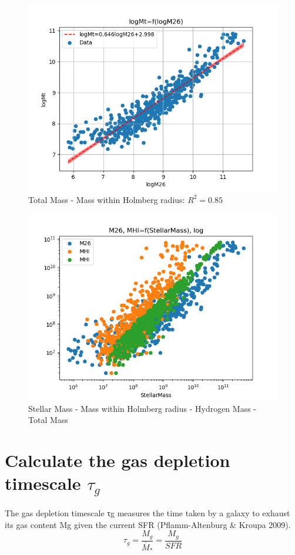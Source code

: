 \documentclass[a4paper]{article}
\begin{document}
\begin{figure}[htbp]
\centering
\includegraphics[width=.9\linewidth]{./graphs/logM26-logMt.png}
\caption{\label{Total Mass - Mass within Holmberg radius}Total Mass - Mass within Holmberg radius: \(R^2=0.85\)}
\end{figure}


\begin{figure}[htbp]
\centering
\includegraphics[width=.9\linewidth]{./graphs/M-MHI-M26.png}
\caption{\label{Stellar Mass - Mass within Holmberg radius - Hydrogen Mass - Total Mass}Stellar Mass - Mass within Holmberg radius - Hydrogen Mass - Total Mass}
\end{figure}


\section{Calculate the gas depletion timescale \(\tau_g\)}
\label{sec:orgaf32583}

The gas depletion timescale τg measures the time taken by a galaxy to exhaust its gas content Mg given the current SFR (Pflamm-Altenburg \& Kroupa 2009).
$$
\tau_g=\frac{M_g}{\dot{M_*}}=\frac{M_g}{SFR}
$$

\printbibliography
\end{document}
